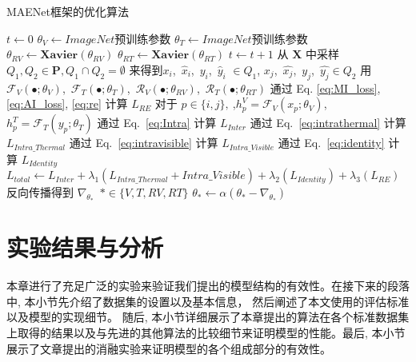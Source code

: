 \begin{algorithm}
  \caption{MAENet框架的优化算法}\label{algo:main}
  $t \leftarrow 0$\;
  $\theta_V \leftarrow ImageNet预训练参数$  \; 
  $\theta_T \leftarrow ImageNet预训练参数$  \; 
  $\theta_{RV} \leftarrow \textbf{Xavier}(\theta_{RV})$  \; 
  $\theta_{RT} \leftarrow \textbf{Xavier}(\theta_{RT})$  \; 
  {
    $t \leftarrow t +1 $\;
   从 $\mathbf{X}$ 中采样 $Q_1, Q_2 \in \mathbf{P}, Q_1 \cap Q_2 = \emptyset $ 来得到$x_i$,~$\hat{x}_i$,~$y_i$,~$\hat{y}_i$ $\in  Q_1$, $x_j$,~$\hat{x_j}$,~${y_j}$,~$\hat{y_j} \in Q_2$ \;
   用 ~$\mathcal{F}_V(\bullet;\theta_V)$,~$\mathcal{F}_T(\bullet;\theta_T)$,~$\mathcal{R}_V(\bullet;\theta_{RV})$,~$\mathcal{R}_T(\bullet;\theta_{RT})$ 通过 Eq. \ref{eq:MI_loss}, \ref{eq:AI_loss}, \ref{eq:re} 计算 $L_{RE}$  \;
   对于 $p \in \{i, j\},~$,$h_p^V = \mathcal{F}_V(x_p;\theta_V)$, $h_p^T = \mathcal{F}_T(y_p;\theta_T)$ \;
   通过 Eq.~\ref{eq:Intra} 计算 $L_{Inter}$ \;
   通过 Eq.~\ref{eq:intrathermal} 计算 $L_{Intra\_Thermal}$ \;
   通过 Eq.~\ref{eq:intravisible} 计算 $L_{Intra\_Visible}$ \;
   通过 Eq.~\ref{eq:identity} 计算 $L_{Identity}$ \;
   $L_{total} \leftarrow L_{Inter} + \lambda_1 (L_{Intra\_Thermal} + Intra\_Visible) + \lambda_2 (L_{Identity}) + \lambda_3 (L_{RE}) $ \;
   反向传播得到 $\nabla_{\theta_*}$~$*\in \{V, T, RV, RT\}$ \;
  $\theta_* \leftarrow \alpha ( \theta_* - \nabla_{\theta_*}) $ \;
  }
 
  \end{algorithm}

\section{实验结果与分析}
本章进行了充足广泛的实验来验证我们提出的模型结构的有效性。在接下来的段落中, 本小节先介绍了数据集的设置以及基本信息， 然后阐述了本文使用的评估标准以及模型的实现细节。 随后, 本小节详细展示了本章提出的算法在各个标准数据集上取得的结果以及与先进的其他算法的比较细节来证明模型的性能。最后, 本小节展示了文章提出的消融实验来证明模型的各个组成部分的有效性。
